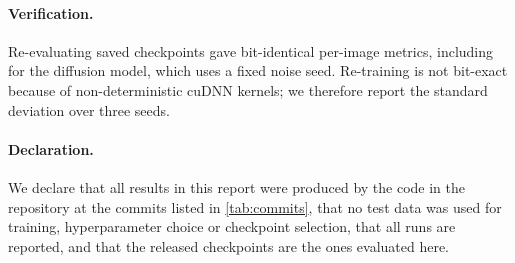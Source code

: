 \documentclass[10pt,twocolumn,letterpaper]{article}
\begin{document}
\paragraph{Verification.} Re-evaluating saved checkpoints gave bit-identical per-image metrics, including for the diffusion model, which uses a fixed noise seed. Re-training is not bit-exact because of non-deterministic cuDNN kernels; we therefore report the standard deviation over three seeds.

\paragraph{Declaration.} We declare that all results in this report were produced by the code in the repository at the commits listed in \cref{tab:commits}, that no test data was used for training, hyperparameter choice or checkpoint selection, that all runs are reported, and that the released checkpoints are the ones evaluated here.

\begin{table}[h]
\centering
\scriptsize
\setlength{\tabcolsep}{2pt}

\caption{\textbf{Commit history} (hash, timestamp in IST, message) at the time of writing. The final commit, which only regenerates this table, is not listed.}
\label{tab:commits}
\end{table}

{
    \small
    
    
}
\end{document}
